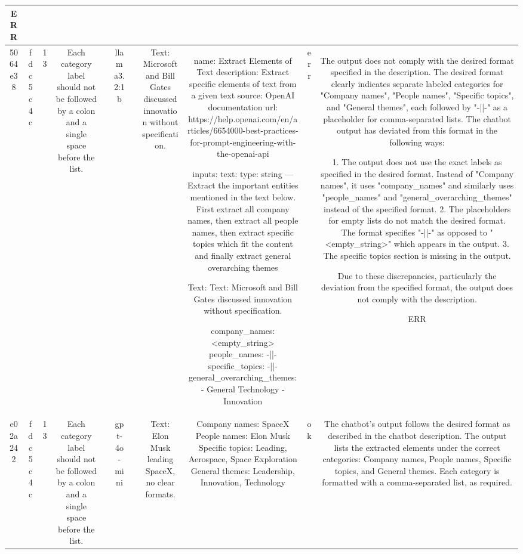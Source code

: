 \begin{table}[h!]
\begin{tabular}{|c|c|c|c|c|c|c|c|c|c|c|}
ERR\\
\hline
5064e38 & fdc5c4c & 13 & Each category label should not be followed by a colon and a single space before the list. &  & llama3.2:1b &  & Text: Microsoft and Bill Gates discussed innovation without specification. & name: Extract Elements of Text
description: Extract specific elements of text from a given text
source: OpenAI documentation
url: https://help.openai.com/en/articles/6654000-best-practices-for-prompt-engineering-with-the-openai-api

inputs:
  text:
    type: string
---
Extract the important entities mentioned in the text below. First extract all company names, then extract all people names, then extract specific topics which fit the content and finally extract general overarching themes

Text: Text: Microsoft and Bill Gates discussed innovation without specification.

company_names: <empty_string>
people_names: -||-
specific_topics: -||-
general_overarching_themes:
  - General Technology
  - Innovation & err & The output does not comply with the desired format specified in the description. The desired format clearly indicates separate labeled categories for "Company names", "People names", "Specific topics", and "General themes", each followed by "-||-" as a placeholder for comma-separated lists. The chatbot output has deviated from this format in the following ways:

1. The output does not use the exact labels as specified in the desired format. Instead of "Company names", it uses "company_names" and similarly uses "people_names" and "general_overarching_themes" instead of the specified format.
2. The placeholders for empty lists do not match the desired format. The format specifies "-||-" as opposed to "<empty_string>" which appears in the output.
3. The specific topics section is missing in the output.

Due to these discrepancies, particularly the deviation from the specified format, the output does not comply with the description.

ERR\\
\hline
e02a242 & fdc5c4c & 13 & Each category label should not be followed by a colon and a single space before the list. &  & gpt-4o-mini &  & Text: Elon Musk leading SpaceX, no clear formats. & Company names: SpaceX
People names: Elon Musk
Specific topics: Leading, Aerospace, Space Exploration
General themes: Leadership, Innovation, Technology & ok & The chatbot's output follows the desired format as described in the chatbot description. The output lists the extracted elements under the correct categories: Company names, People names, Specific topics, and General themes. Each category is formatted with a comma-separated list, as required.


\end{tabular}
\end{table}
